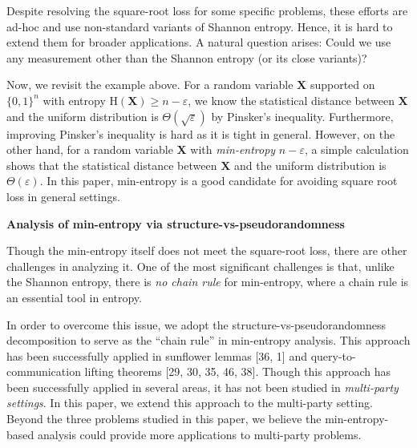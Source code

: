 \documentclass[10pt,a4paper]{article}
\begin{document}
Despite resolving the square-root loss for some specific problems, these efforts are ad-hoc and use non-standard variants of Shannon entropy. Hence, it is hard to extend them for broader applications. A natural question arises: Could we use any measurement other than the Shannon entropy (or its close variants)?\par




Now, we revisit the example above. For a random variable $\bm{X}$ supported on $\{0,1\}^{n}$ with entropy $\text{H}(\bm{X})\geq n-\varepsilon$, we know the statistical distance between $\bm{X}$ and the uniform distribution is $\Theta(\sqrt{\varepsilon})$ by Pinsker’s inequality. Furthermore, improving Pinsker’s inequality is hard as it is tight in general. However, on the other hand, for a random variable $\bm{X}$ with \emph{min-entropy} $n-\varepsilon$, a simple calculation shows that the statistical distance between $\bm{X}$ and the uniform distribution is $\Theta(\varepsilon)$. In this paper, min-entropy is a good candidate for avoiding square root loss in general settings.\par





\par\medskip\noindent\textbf{Analysis of min-entropy via structure-vs-pseudorandomness}\par




Though the min-entropy itself does not meet the square-root loss, there are other challenges in analyzing it. One of the most significant challenges is that, unlike the Shannon entropy, there is \emph{no chain rule} for min-entropy, where a chain rule is an essential tool in entropy.\par




In order to overcome this issue, we adopt the structure-vs-pseudorandomness decomposition to serve as the “chain rule” in min-entropy analysis. This approach has been successfully applied in sunflower lemmas [36, 1] and query-to-communication lifting theorems [29, 30, 35, 46, 38]. Though this approach has been successfully applied in several areas, it has not been studied in \emph{multi-party settings}.
In this paper, we extend this approach to the multi-party setting. Beyond the three problems studied in this paper, we believe the min-entropy-based analysis could provide more applications to multi-party problems.\par
\end{document}
